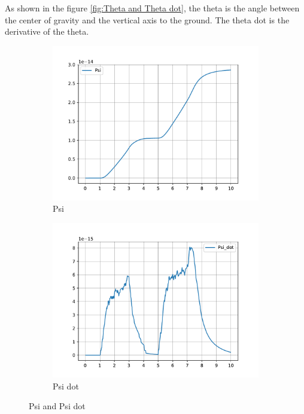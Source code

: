 As shown in the figure \ref{fig:Theta and Theta dot}, the theta is the angle between the center of gravity and the vertical axis to the ground. The theta dot is the derivative of the theta.
\begin{figure}[h]
	\centering
	\begin{subfigure}[t]{0.45\textwidth}
		\includegraphics[width=\textwidth]{Psi}
		\caption{Psi}
		\label{fig:Psi}
	\end{subfigure}
	\begin{subfigure}[t]{0.45\textwidth}
		\includegraphics[width=\textwidth]{Psi_dot}
		\caption{Psi dot}
		\label{fig:Psi dot}
	\end{subfigure}
	\caption{Psi and Psi dot}
	\label{fig:Psi and Psi dot}
\end{figure}

